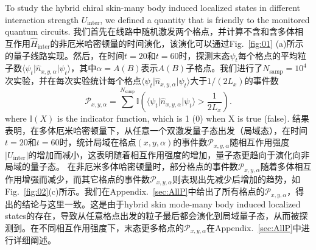 \documentclass[longbibliography, aps, prx, amsmath, amssymb, amsfonts, twocolumn,superscriptaddress, footinbib]{revtex4-1}
\begin{document}
	To study the hybrid chiral skin-many body induced localized states in different interaction strength $U_{\text{inter}}$, we defined a quantity that is friendly to the monitored quantum circuits. %
	我们首先在线路中随机激发两个格点，并计算不含和含多体相互作用$\hat{H}_{\text{inter}}$的非厄米哈密顿量的时间演化，该演化可以通过Fig.~\ref{fig:01} (a)所示的量子线路实现。然后，在时间$t=20$和$t=60$时，探测末态$\psi_t$每个格点的平均粒子数$\langle \psi_{t} \vert \hat{n}_{x,y,\alpha} \vert \psi_t \rangle$，其中$\alpha=A(B)$表示$A(B)$子格点。我们进行了$N_{\text{samp}}=10^{4}$次实验，并在每次实验统计每个格点$\langle \psi_{t} \vert \hat{n}_{x,y,\alpha} \vert \psi_t \rangle$大于$1/(2L_x)$的事件数
	\begin{equation}
		\mathcal{P}_{{x}, {y}, {\alpha}} = \sum^{N_{\text{samp}}} \mathbb{I}(\langle \psi_{t} \vert \hat{n}_{x,y,\alpha} \vert \psi_t \rangle > \frac{1}{2L_x}).
	\end{equation}
	where $\mathbb{I}(X)$ is the indicator function, which is 1 (0) when X is true (false).%
	结果表明，在多体厄米哈密顿量下，从任意一个双激发量子态出发（局域态），在时间$t=20$和$t=60$时，统计局域在格点$(x,y,\alpha)$的事件数$\mathcal{P}_{x,y,\alpha}$随相互作用强度$\vert U_{\text{inter}} \vert$的增加而减小，这表明随着相互作用强度的增加，量子态更趋向于演化向非局域的量子态。
	在非厄米多体哈密顿量时，部分格点的事件数$\mathcal{P}_{x,y,\alpha}$随着多体相互作用增强而减少，而其它格点的事件数$\mathcal{P}_{x,y,\alpha}$则表现出先减少后增加的趋势，如Fig.~\ref{fig:02}(c)所示。我们在Appendix.~\ref{sec:AllP}中给出了所有格点的$\mathcal{P}_{x,y,\alpha}$，得出的结论与这里一致。这是由于hybrid skin mode-many body induced localized states的存在，导致从任意格点出发的粒子最后都会演化到局域量子态，从而被探测到。在不同相互作用强度下，末态更多格点的$\mathcal{P}_{x,y,\alpha}$在Appendix.~\ref{sec:AllP}中进行详细阐述。
\end{document}
